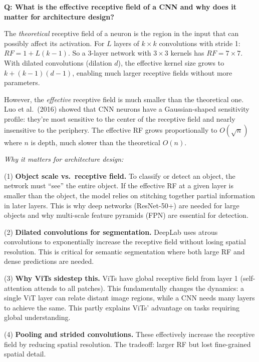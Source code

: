 \begin{interviewq}
\textbf{Q: What is the effective receptive field of a CNN and why does it matter for architecture design?}

 \quad {} \quad \badgefreq{\freqmed}

\stronganswer The \textit{theoretical} receptive field of a neuron is the region in the input that can possibly affect its activation. For $L$ layers of $k \times k$ convolutions with stride 1: $RF = 1 + L(k-1)$. So a 3-layer network with $3 \times 3$ kernels has $RF = 7 \times 7$. With dilated convolutions (dilation $d$), the effective kernel size grows to $k + (k-1)(d-1)$, enabling much larger receptive fields without more parameters.

However, the \textit{effective} receptive field is much smaller than the theoretical one. Luo et al.\ (2016) showed that CNN neurons have a Gaussian-shaped sensitivity profile: they're most sensitive to the center of the receptive field and nearly insensitive to the periphery. The effective RF grows proportionally to $O(\sqrt{n})$ where $n$ is depth, much slower than the theoretical $O(n)$.

\textit{Why it matters for architecture design:}

(1) \textbf{Object scale vs.\ receptive field.} To classify or detect an object, the network must ``see'' the entire object. If the effective RF at a given layer is smaller than the object, the model relies on stitching together partial information in later layers. This is why deep networks (ResNet-50+) are needed for large objects and why multi-scale feature pyramids (FPN) are essential for detection.

(2) \textbf{Dilated convolutions for segmentation.} DeepLab uses atrous convolutions to exponentially increase the receptive field without losing spatial resolution. This is critical for semantic segmentation where both large RF and dense predictions are needed.

(3) \textbf{Why ViTs sidestep this.} ViTs have global receptive field from layer 1 (self-attention attends to all patches). This fundamentally changes the dynamics: a single ViT layer can relate distant image regions, while a CNN needs many layers to achieve the same. This partly explains ViTs' advantage on tasks requiring global understanding.

(4) \textbf{Pooling and strided convolutions.} These effectively increase the receptive field by reducing spatial resolution. The tradeoff: larger RF but lost fine-grained spatial detail.


\end{interviewq}
